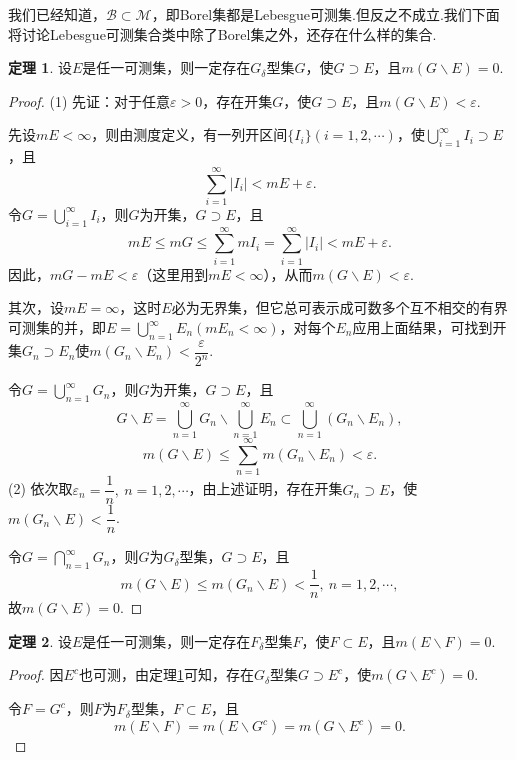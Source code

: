 \documentclass[lang=cn,12pt]{ctexart}
\theoremstyle{definition}
\newtheorem{theorem}{定理}
\theoremstyle{plain}
\begin{document}
我们已经知道，$\mathcal{B}\subset\mathcal{M}$，即Borel集都是Lebesgue可测集.但反之不成立.我们下面将讨论Lebesgue可测集合类中除了Borel集之外，还存在什么样的集合.

\begin{theorem}\label{g}
	设$E$是任一可测集，则一定存在$G_{\delta}$型集$G$，使$G\supset E$，且$m(G\backslash E)=0$.
\end{theorem}
\begin{proof}
		(1) 先证：对于任意$\varepsilon>0$，存在开集$G$，使$G\supset E$，且$m(G\backslash E)<\varepsilon$.
		
		先设$mE<\infty$，则由测度定义，有一列开区间$\{I_i\}(i=1,2,\cdots)$，使$\bigcup\limits_{i=1}^{\infty}I_i\supset E$，且
		$$\sum_{i=1}^{\infty}|I_i|<mE+\varepsilon.$$
		令$G=\bigcup\limits_{i=1}^{\infty}I_i$，则$G$为开集，$G\supset E$，且
		$$mE\leqslant mG\leqslant\sum_{i=1}^{\infty}mI_i=\sum_{i=1}^{\infty}|I_i|<mE+\varepsilon.$$
		因此，$mG-mE<\varepsilon$（这里用到$mE<\infty$），从而$m(G\backslash E)<\varepsilon$.
		
		\hspace*{\fill}
		
		其次，设$mE=\infty$，这时$E$必为无界集，但它总可表示成可数多个互不相交的有界可测集的并，即$E=\bigcup\limits_{n=1}^{\infty}E_n(mE_n<\infty)$，对每个$E_n$应用上面结果，可找到开集$G_n\supset E_n$使$m(G_n\backslash E_n)<\dfrac{\varepsilon}{2^n}$.
		
		令$G=\bigcup\limits_{n=1}^{\infty}G_n$，则$G$为开集，$G\supset E$，且
		$$G\backslash E=\bigcup\limits_{n=1}^{\infty}G_n\backslash\bigcup\limits_{n=1}^{\infty}E_n\subset\bigcup\limits_{n=1}^{\infty}(G_n\backslash E_n),$$
		$$m(G\backslash E)\leqslant\sum_{n=1}^{\infty}m(G_n\backslash E_n)<\varepsilon.$$
		(2) 依次取$\varepsilon_n=\dfrac{1}{n},\ n=1,2,\cdots$，由上述证明，存在开集$G_n\supset E$，使$m(G_n\backslash E)<\dfrac{1}{n}$.
		
		令$G=\bigcap\limits_{n=1}^{\infty}G_n$，则$G$为$G_{\delta}$型集，$G\supset E$，且
		$$m(G\backslash E)\leqslant m(G_n\backslash E)<\dfrac{1}{n},\ n=1,2,\cdots,$$
		故$m(G\backslash E)=0$.
\end{proof}
\begin{theorem}
	设$E$是任一可测集，则一定存在$F_{\delta}$型集$F$，使$F\subset E$，且$m(E\backslash F)=0$.
\end{theorem}
\begin{proof}
	因$E^c$也可测，由定理\ref{g}可知，存在$G_{\delta}$型集$G\supset E^c$，使$m(G\backslash E^c)=0$.
	
	令$F=G^c$，则$F$为$F_{\delta}$型集，$F\subset E$，且
	$$m(E\backslash F)=m(E\backslash G^c)=m(G\backslash E^c)=0.$$
	
\end{proof}
\end{document}
